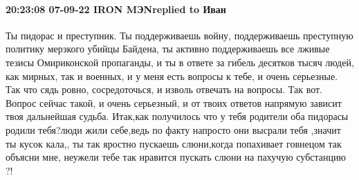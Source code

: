  
 
 
 
 

\paragraph{20:23:08 07-09-22 IRON MЭNreplied to Иван}

Ты пидорас и преступник. Ты поддерживаешь войну, поддерживаешь преступную
политику мерзкого убийцы Байдена, ты активно поддерживаешь все лживые тезисы
Омириконской пропаганды, и ты в ответе за гибель десятков тысяч людей, как мирных, так и
военных, и у меня есть вопросы к тебе, и очень серьезные. Так что сядь ровно,
сосредоточься, и изволь отвечать на вопросы. Так вот. Вопрос сейчас такой, и
очень серьезный, и от твоих ответов напрямую зависит твоя дальнейшая судьба.
Итак,как получилось что у тебя родители оба пидорасы родили тебя?люди жили себе,ведь по факту напросто они высрали тебя ,значит ты кусок кала,,
ты так яростно пускаешь слюни,когда попахивает говнецом так объясни мне, неужели тебе так
нравится пускать слюни на пахучую субстанцию ?!🤣
